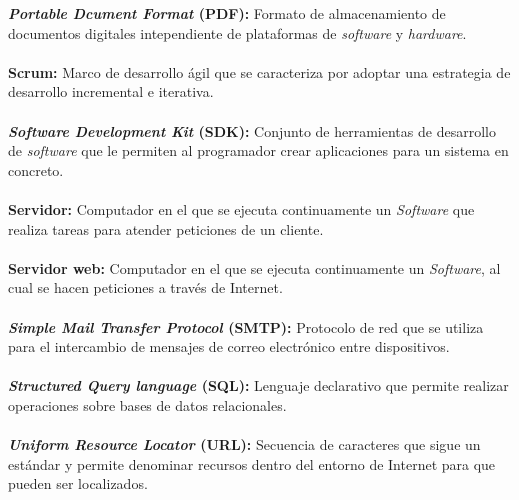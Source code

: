 \textbf{\textit{Portable Dcument Format} (PDF):} Formato de almacenamiento de documentos digitales intependiente de plataformas de \textit{software} y \textit{hardware}.\\ \\
\textbf{Scrum:} Marco de desarrollo ágil que se caracteriza por adoptar una estrategia de desarrollo incremental e iterativa.\\ \\
\textbf{\textit{Software Development Kit} (SDK):} Conjunto de herramientas de desarrollo de \textit{software} que le permiten al programador crear aplicaciones para un sistema en concreto.\\ \\
\textbf{Servidor:} Computador en el que se ejecuta continuamente un \textit{Software} que realiza tareas para atender peticiones de un cliente.\\ \\
\textbf{Servidor web:} Computador en el que se ejecuta continuamente un \textit{Software}, al cual se hacen peticiones a través de Internet.\\ \\
\textbf{\textit{Simple Mail Transfer Protocol} (SMTP):} Protocolo de red que se utiliza para el intercambio de mensajes de correo electrónico entre dispositivos.\\ \\
\textbf{\textit{Structured Query language} (SQL):} Lenguaje declarativo que permite realizar operaciones sobre bases de datos relacionales.\\ \\
\textbf{\textit{Uniform Resource Locator} (URL):} Secuencia de caracteres que sigue un estándar y permite denominar recursos dentro del entorno de Internet para que pueden ser localizados.\\